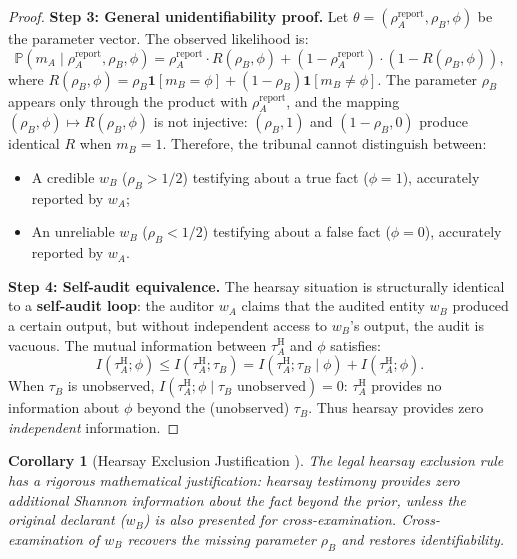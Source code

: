 \documentclass[11pt,a4paper]{article}
\newtheorem{corollary}[theorem]{Corollary}
\theoremstyle{definition}
\newcommand{\Pbb}{\mathbb{P}}
\newcommand{\ind}[1]{\mathbf{1}[#1]}
\newcommand{\fact}{\phi}                        %
\newcommand{\hear}{\mathrm{H}}                  %
\begin{document}
\begin{proof}
\medskip\noindent\textbf{Step 3: General unidentifiability proof.}
Let $\theta = (\rho_A^{\mathrm{report}}, \rho_B, \fact)$ be the parameter vector. The observed likelihood is:
\begin{equation}
    \Pbb(m_A \mid \rho_A^{\mathrm{report}}, \rho_B, \fact) = \rho_A^{\mathrm{report}} \cdot R(\rho_B, \fact) + (1 - \rho_A^{\mathrm{report}}) \cdot (1 - R(\rho_B, \fact)),
    \label{eq:hearsay_likelihood}
\end{equation}
where $R(\rho_B, \fact) = \rho_B \ind{m_B = \fact} + (1 - \rho_B) \ind{m_B \neq \fact}$. The parameter $\rho_B$ appears only through the product with $\rho_A^{\mathrm{report}}$, and the mapping $(\rho_B, \fact) \mapsto R(\rho_B, \fact)$ is not injective: $(\rho_B, 1)$ and $(1 - \rho_B, 0)$ produce identical $R$ when $m_B = 1$. Therefore, the tribunal cannot distinguish between:
\begin{itemize}
    \item A credible $w_B$ ($\rho_B > 1/2$) testifying about a true fact ($\fact = 1$), accurately reported by $w_A$;
    \item An unreliable $w_B$ ($\rho_B < 1/2$) testifying about a false fact ($\fact = 0$), accurately reported by $w_A$.
\end{itemize}

\medskip\noindent\textbf{Step 4: Self-audit equivalence.}
The hearsay situation is structurally identical to a \textbf{self-audit loop}: the auditor $w_A$ claims that the audited entity $w_B$ produced a certain output, but without independent access to $w_B$'s output, the audit is vacuous. The mutual information between $\tau_A^{\hear}$ and $\fact$ satisfies:
\begin{equation}
    I(\tau_A^{\hear}; \fact) \leq I(\tau_A^{\hear}; \tau_B) = I(\tau_A^{\hear}; \tau_B \mid \fact) + I(\tau_A^{\hear}; \fact).
\end{equation}
When $\tau_B$ is unobserved, $I(\tau_A^{\hear}; \fact \mid \tau_B \text{ unobserved}) = 0$: $\tau_A^{\hear}$ provides no information about $\fact$ beyond the (unobserved) $\tau_B$. Thus hearsay provides zero \textit{independent} information.
\end{proof}

\begin{corollary}[Hearsay Exclusion Justification ]
\label{cor:hearsay_exclusion}
The legal hearsay exclusion rule has a rigorous mathematical justification: hearsay testimony provides zero additional Shannon information about the fact beyond the prior, unless the original declarant ($w_B$) is also presented for cross-examination. Cross-examination of $w_B$ recovers the missing parameter $\rho_B$ and restores identifiability.
\end{corollary}
\end{document}
